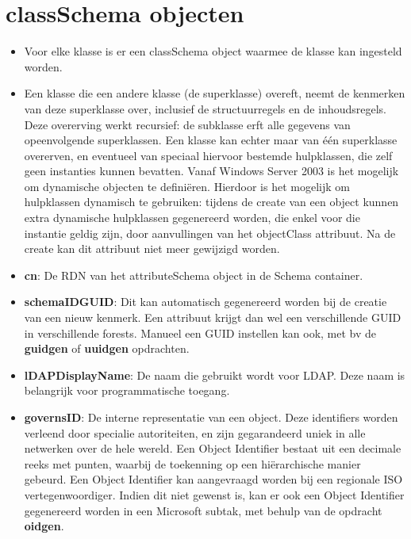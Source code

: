 \documentclass{report}
\begin{document}
	\section{classSchema objecten }
	\begin{enumerate}
		 { 
			\begin{itemize}
				\item Voor elke klasse is er een classSchema object waarmee de klasse kan ingesteld worden. 
			\end{itemize}	
		}
		
		 {
			\begin{itemize}
				\item Een klasse die een andere klasse (de superklasse) overeft, neemt de kenmerken van deze superklasse over, inclusief de structuurregels en de inhoudsregels. Deze overerving werkt recursief: de subklasse erft alle gegevens van opeenvolgende superklassen. Een klasse kan echter maar van één superklasse overerven, en eventueel van speciaal hiervoor bestemde hulpklassen, die zelf geen instanties kunnen bevatten. Vanaf Windows Server 2003 is het mogelijk om dynamische objecten te definiëren. Hierdoor is het mogelijk om hulpklassen dynamisch te gebruiken: tijdens de create van een object kunnen extra dynamische hulpklassen gegenereerd worden, die enkel voor die instantie geldig zijn, door aanvullingen van het objectClass attribuut. Na de create kan dit attribuut niet meer gewijzigd worden.
			\end{itemize}	
		}
		
		 { 
			\begin{itemize}
				\item \textbf{cn}: De RDN van het attributeSchema object in de Schema container.
				\item \textbf{schemaIDGUID}: Dit kan automatisch gegenereerd worden bij de creatie van een nieuw kenmerk. Een attribuut krijgt dan wel een verschillende GUID in verschillende forests. Manueel een GUID instellen kan ook, met bv de \textbf{guidgen} of \textbf{uuidgen} opdrachten.
				\item \textbf{lDAPDisplayName}: De naam die gebruikt wordt voor LDAP. Deze naam is belangrijk voor programmatische toegang.
				\item \textbf{governsID}: De interne representatie van een object. Deze identifiers worden verleend door specialie autoriteiten, en zijn gegarandeerd uniek in alle netwerken over de hele wereld. Een Object Identifier bestaat uit een decimale reeks met punten, waarbij de toekenning op een hiërarchische manier gebeurd. Een Object Identifier kan aangevraagd worden bij een regionale ISO vertegenwoordiger. Indien dit niet gewenst is, kan er ook een Object Identifier gegenereerd worden in een Microsoft subtak, met behulp van de opdracht \textbf{oidgen}.
			\end{itemize}
		}
		

\end{enumerate}
\end{document}
